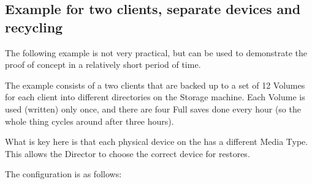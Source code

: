 \subsection{Example for two clients, separate devices and recycling}

The following example is not very practical, but can be used to demonstrate
the proof of concept in a relatively short period of time.

The example
consists of a two clients that are backed up to a set of 12 Volumes for each client
into different directories on the Storage
machine.  Each Volume is used (written) only once, and there are four Full
saves done every hour (so the whole thing cycles around after three hours).

What is key here is that each physical device on the \bareosSd
has a different Media Type. This allows the Director to choose the
correct device for restores.

The \bareosDir configuration is as follows:


